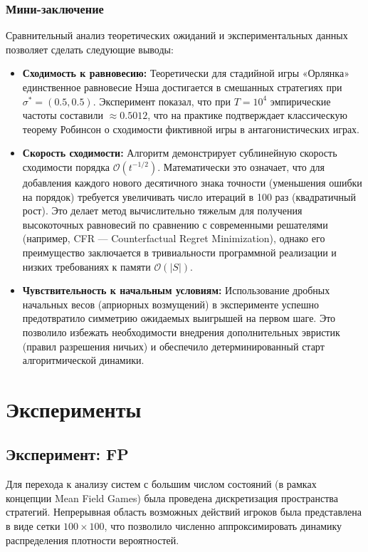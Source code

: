 \subsubsection{Мини-заключение}

Сравнительный анализ теоретических ожиданий и экспериментальных данных позволяет сделать следующие выводы:

\begin{itemize}
    \item \textbf{Сходимость к равновесию:} Теоретически для стадийной игры «Орлянка» единственное равновесие Нэша достигается в смешанных стратегиях при $\sigma^* = (0.5, 0.5)$. Эксперимент показал, что при $T=10^4$ эмпирические частоты составили $\approx 0.5012$, что на практике подтверждает классическую теорему Робинсон о сходимости фиктивной игры в антагонистических играх.
    
    \item \textbf{Скорость сходимости:} Алгоритм демонстрирует сублинейную скорость сходимости порядка $\mathcal{O}(t^{-1/2})$. Математически это означает, что для добавления каждого нового десятичного знака точности (уменьшения ошибки на порядок) требуется увеличивать число итераций в 100 раз (квадратичный рост). Это делает метод вычислительно тяжелым для получения высокоточных равновесий по сравнению с современными решателями (например, CFR — Counterfactual Regret Minimization), однако его преимущество заключается в тривиальности программной реализации и низких требованиях к памяти $\mathcal{O}(|S|)$.
    
    \item \textbf{Чувствительность к начальным условиям:} Использование дробных начальных весов (априорных возмущений) в эксперименте успешно предотвратило симметрию ожидаемых выигрышей на первом шаге. Это позволило избежать необходимости внедрения дополнительных эвристик (правил разрешения ничьих) и обеспечило детерминированный старт алгоритмической динамики.
\end{itemize}

\section{Эксперименты}
\subsection{Эксперимент: FP}

Для перехода к анализу систем с большим числом состояний (в рамках концепции Mean Field Games) была проведена дискретизация пространства стратегий. Непрерывная область возможных действий игроков была представлена в виде сетки $100 \times 100$, что позволило численно аппроксимировать динамику распределения плотности вероятностей.

